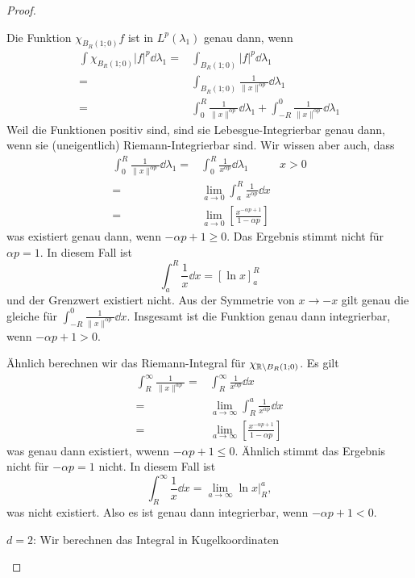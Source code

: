 \begin{proof}
	\begin{parts}
	\item Die Funktion $\chi_{B_R(1;0)}f$ ist in $L^p(\lambda_1)$ genau dann, wenn
	\begin{align*}
		\int \chi_{B_R(1;0)}|f|^p \dd{\lambda_1}=&\int_{B_R(1;0)} |f|^p \dd{\lambda_1}\\
		=&\int_{B_R(1;0)}\frac{1}{\|x\|^{\alpha p}}\dd{\lambda_1}\\
		=&\int_0^R \frac{1}{\|x\|^{\alpha p}}\dd{\lambda_1}+\int_{-R}^0 \frac{1}{\|x\|^{\alpha p}}\dd{\lambda_1}
	\end{align*}
	Weil die Funktionen positiv sind, sind sie Lebesgue-Integrierbar genau dann, wenn sie (uneigentlich) Riemann-Integrierbar sind. Wir wissen aber auch, dass
	\begin{align*}
		\int_0^R \frac{1}{\|x\|^{\alpha p}}\dd{\lambda_1}=&\int_0^R \frac{1}{x^{\alpha p}}\dd{\lambda_1} & x>0\\
		=&\lim_{a \to 0} \int_a^R \frac{1}{x^{\alpha p}}\dd{x}\\
		=&\lim_{a \to 0}\left[ \frac{x^{-\alpha p + 1}}{1-\alpha p} \right] 
	\end{align*}
	was existiert genau dann, wenn $-\alpha p + 1 \ge 0$. Das Ergebnis stimmt nicht f\"{u}r $\alpha p=1$. In diesem Fall ist
	\[
		\int_a^R \frac{1}{x}\dd{x}=[\ln x]_a^R
	\]
	und der Grenzwert existiert nicht. Aus der Symmetrie von $x\to -x$ gilt genau die gleiche f\"{u}r $\int_{-R}^0 \frac{1}{\|x\|^{\alpha p}}\dd{x}$. Insgesamt ist die Funktion genau dann integrierbar, wenn $-\alpha p + 1 >0$. 

	Ähnlich berechnen wir das Riemann-Integral f\"{u}r $\chi_{\mathbb{R}\backslash B_R(1;0)}$. Es gilt
	\begin{align*}
		\int_R^\infty \frac{1}{\|x\|^{\alpha p}}=&\int_R^\infty \frac{1}{x^{\alpha p}}\dd{x}\\
		=&\lim_{a \to \infty} \int_R^a \frac{1}{x^{\alpha p}}\dd{x}\\
		=&\lim_{a \to \infty} \left[ \frac{x^{-\alpha p+1}}{1-\alpha p} \right]
	\end{align*}
	was genau dann existiert, wwenn $-\alpha p + 1\le 0$. Ähnlich stimmt das Ergebnis nicht f\"{u}r $-\alpha p = 1$ nicht. In diesem Fall ist
	\[
		\int_R^\infty \frac{1}{x}\dd{x}=\lim_{a \to \infty} \ln x |_R^a
	,\]
	was nicht existiert. Also es ist genau dann integrierbar, wenn $-\alpha p + 1 < 0$.
\item $d=2$: Wir berechnen das Integral in Kugelkoordinaten 
	\end{parts}
\end{proof}
